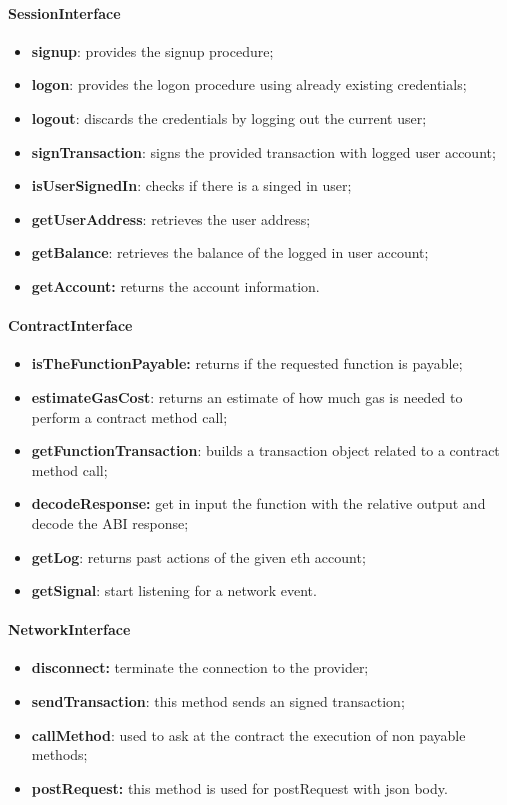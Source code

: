 \paragraph{SessionInterface}
\begin{itemize}
    \item \textbf{signup}: provides the signup procedure;
    \item \textbf{logon}: provides the logon procedure using already existing credentials;
    \item \textbf{logout}: discards the credentials by logging out the current user;
    \item \textbf{signTransaction}: signs the provided transaction with logged user account;
    \item \textbf{isUserSignedIn}: checks if there is a singed in user;
    \item \textbf{getUserAddress}: retrieves the user address;
    \item \textbf{getBalance}: retrieves the balance of the logged in user account;
    \item \textbf{getAccount:} returns the account information.
\end{itemize}
\paragraph{ContractInterface}
\begin{itemize}
	\item \textbf{isTheFunctionPayable:} returns if the requested function is payable;
	\item \textbf{estimateGasCost}: returns an estimate of how much gas is needed to perform a contract method call;
	\item \textbf{getFunctionTransaction}: builds a transaction object related to a contract method call;
	\item \textbf{decodeResponse:} get in input the function with the relative output and decode the ABI response;
    \item \textbf{getLog}: returns past actions of the given eth account;
    \item \textbf{getSignal}: start listening for a network event.
\end{itemize}
\paragraph{NetworkInterface}
\begin{itemize}
	\item \textbf{disconnect:} terminate the connection to the provider;
    \item \textbf{sendTransaction}: this method sends an signed transaction;
    \item \textbf{callMethod}: used to ask at the contract the execution of non payable methods;
    \item \textbf{postRequest:} this method is used for postRequest with json body.
\end{itemize}
